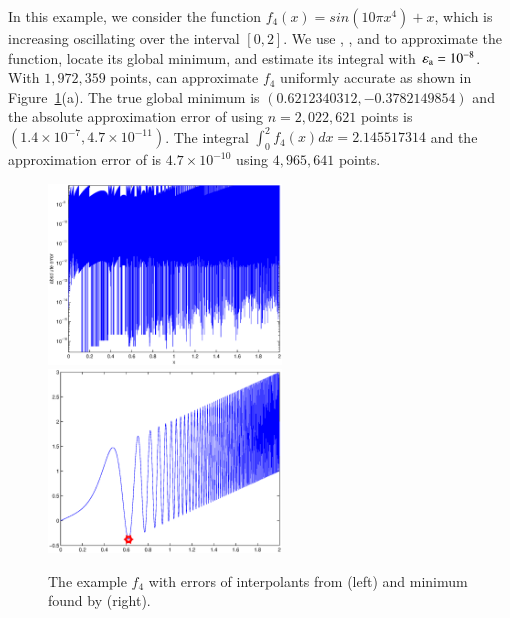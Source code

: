 \begin{exmp}
In this example, we consider the function $f_4(x) = sin(10 \pi x^4) + x$, which is increasing oscillating over the interval $[0,2]$.
We use \funappxg, \funming, and \integralg to approximate the function, locate its global minimum, and estimate its integral with $\varepsilon_{\textrm{a}} = 10^{-8}$.
With $1,972,359$ points, \funappxg can approximate $f_4$ uniformly accurate as shown in Figure~\ref{f4fig}(a).
The true global minimum is $(0.6212340312, -0.3782149854)$ and the absolute approximation error of \funming using $n=2,022,621$ points is      
$(1.4\times 10^{-7}, 4.7\times 10^{-11})$. The integral 
$\int_{0}^{2} f_4 (x) dx = 2.145517314$ and the approximation error of \integralg is $4.7\times10^{-10}$ using $4,965,641$ points.

\begin{figure}[bt]
\centering
\includegraphics[width=6.2cm]{figure/f4_funappx_error.eps} \hspace{-5ex}
\includegraphics[width=6.2cm]{figure/f4_funmin_g.eps}
\caption{The example $f_4$ with errors of interpolants from \funappxg (left) and minimum found by \funming (right).}
\label{f4fig}
\end{figure}
\end{exmp}

